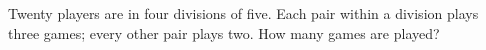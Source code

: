Twenty players are in four divisions of five. Each pair within a division plays three games; every other pair plays two. How many games are played?
